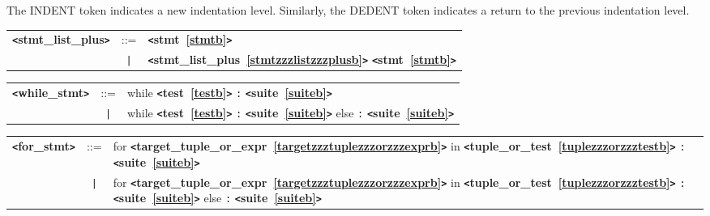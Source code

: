 \documentclass[12pt]{article}
\begin{document}
The INDENT token indicates a new indentation level.  Similarly, the DEDENT token indicates a return to the previous indentation level.

\label{stmtzzzlistzzzplusb}
\begin{tabular}{lcl}
{\bf \verb+<+stmt\_list\_plus\verb+>+} & ::=  & {\bf \verb+<+stmt~\ref{stmtb}\verb+>+}  \\
 & \verb+|+  & {\bf \verb+<+stmt\_list\_plus~\ref{stmtzzzlistzzzplusb}\verb+>+}  {\bf \verb+<+stmt~\ref{stmtb}\verb+>+}  \\
\end{tabular}

\label{whilezzzstmtb}
\newlength{\tw}
\settowidth{\tw}{while\_stmt  ::=  }
\addtolength{\tw}{2\arraycolsep}
\newlength{\len}
\setlength{\len}{\textwidth}
\addtolength{\len}{-1\tw}
\begin{tabular}{lcp{\len}}
{\bf \verb+<+while\_stmt\verb+>+} & ::=  & while {\bf \verb+<+test~\ref{testb}\verb+>+}  \verb|:| {\bf \verb+<+suite~\ref{suiteb}\verb+>+}  \\
 & \verb+|+  & while {\bf \verb+<+test~\ref{testb}\verb+>+}  \verb|:| {\bf \verb+<+suite~\ref{suiteb}\verb+>+}  else \verb|:| {\bf \verb+<+suite~\ref{suiteb}\verb+>+}  \\
\end{tabular}

\label{forzzzstmtb}
\newlength{\tw}
\settowidth{\tw}{for\_stmt  ::=  }
\addtolength{\tw}{2\arraycolsep}
\newlength{\len}
\setlength{\len}{\textwidth}
\addtolength{\len}{-1\tw}
\begin{tabular}{lcp{\len}}
{\bf \verb+<+for\_stmt\verb+>+} & ::=  & for {\bf \verb+<+target\_tuple\_or\_expr~\ref{targetzzztuplezzzorzzzexprb}\verb+>+}  in {\bf \verb+<+tuple\_or\_test~\ref{tuplezzzorzzztestb}\verb+>+}  \verb|:| {\bf \verb+<+suite~\ref{suiteb}\verb+>+}  \\
 & \verb+|+  & for {\bf \verb+<+target\_tuple\_or\_expr~\ref{targetzzztuplezzzorzzzexprb}\verb+>+}  in {\bf \verb+<+tuple\_or\_test~\ref{tuplezzzorzzztestb}\verb+>+}  \verb|:| {\bf \verb+<+suite~\ref{suiteb}\verb+>+}  else \verb|:| {\bf \verb+<+suite~\ref{suiteb}\verb+>+}  \\
\end{tabular}
\end{document}
